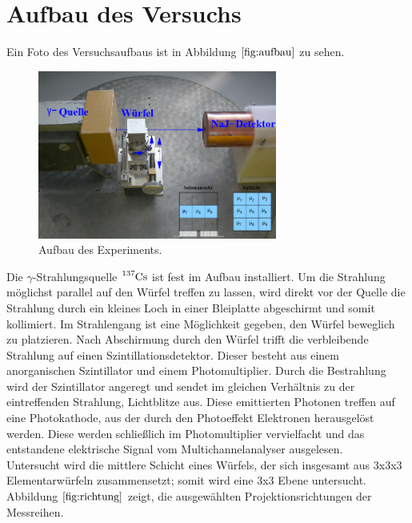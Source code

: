 \section{Aufbau des Versuchs}

Ein Foto des Versuchsaufbaus ist in Abbildung $\ref{fig:aufbau}$ zu sehen.
\begin{figure}[H]
  \centering
  \includegraphics[width=0.7\textwidth]{Bilder/aufbau.png}
  \caption{Aufbau des Experiments.\cite{anleitung}}
  \label{fig:aufbau}
\end{figure}

Die $\gamma$-Strahlungsquelle $\ce{^{137}Cs}$ ist fest im Aufbau installiert. Um die Strahlung möglichst parallel auf den Würfel treffen zu lassen, wird direkt vor der Quelle die Strahlung durch ein
kleines Loch in einer Bleiplatte abgeschirmt und somit kollimiert.
Im Strahlengang ist eine Möglichkeit gegeben, den Würfel beweglich zu platzieren.
Nach Abschirmung durch den Würfel trifft die verbleibende Strahlung auf einen Szintillationsdetektor.
Dieser besteht aus einem anorganischen Szintillator und einem Photomultiplier.
Durch die Bestrahlung wird der Szintillator angeregt und sendet im gleichen Verhältnis zu der eintreffenden Strahlung, Lichtblitze aus.
Diese emittierten Photonen treffen auf eine Photokathode, aus der durch den Photoeffekt Elektronen herausgelöst werden.
Diese werden schließlich im Photomultiplier vervielfacht und das entstandene elektrische Signal vom Multichannelanalyser ausgelesen.\\
Untersucht wird die mittlere Schicht eines Würfels, der sich insgesamt aus 3x3x3 Elementarwürfeln zusammensetzt; somit wird eine 3x3 Ebene untersucht.
Abbildung $\ref{fig:richtung}$ zeigt, die ausgewählten Projektionsrichtungen der Messreihen.
\clearpage
